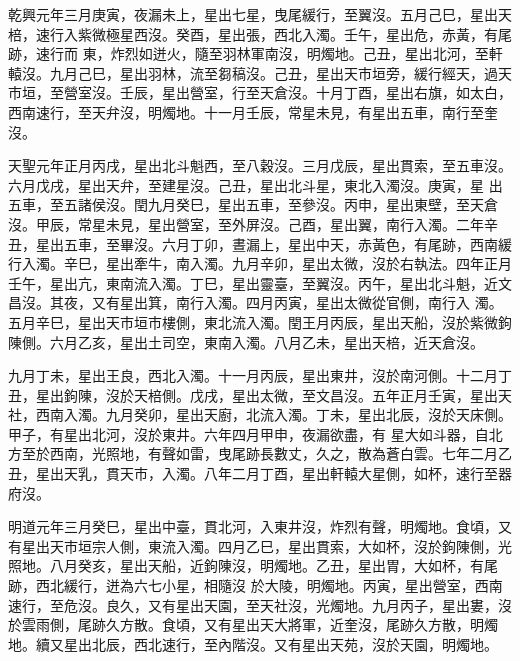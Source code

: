 \begin{pinyinscope}
 乾興元年三月庚寅，夜漏未上，星出七星，曳尾緩行，至翼沒。五月己巳，星出天棓，速行入紫微極星西沒。癸酉，星出張，西北入濁。壬午，星出危，赤黃，有尾跡，速行而
 東，炸烈如迸火，隨至羽林軍南沒，明燭地。己丑，星出北河，至軒轅沒。九月己巳，星出羽林，流至芻稿沒。己丑，星出天市垣旁，緩行經天，過天市垣，至營室沒。壬辰，星出營室，行至天倉沒。十月丁酉，星出右旗，如太白，西南速行，至天弁沒，明燭地。十一月壬辰，常星未見，有星出五車，南行至奎沒。



 天聖元年正月丙戌，星出北斗魁西，至八穀沒。三月戊辰，星出貫索，至五車沒。六月戊戌，星出天弁，至建星沒。己丑，星出北斗星，東北入濁沒。庚寅，星
 出五車，至五諸侯沒。閏九月癸巳，星出五車，至參沒。丙申，星出東壁，至天倉沒。甲辰，常星未見，星出營室，至外屏沒。己酉，星出翼，南行入濁。二年辛丑，星出五車，至畢沒。六月丁卯，晝漏上，星出中天，赤黃色，有尾跡，西南緩行入濁。辛巳，星出牽牛，南入濁。九月辛卯，星出太微，沒於右執法。四年正月壬午，星出亢，東南流入濁。丁巳，星出靈臺，至翼沒。丙午，星出北斗魁，近文昌沒。其夜，又有星出箕，南行入濁。四月丙寅，星出太微從官側，南行入
 濁。五月辛巳，星出天市垣市樓側，東北流入濁。閏王月丙辰，星出天船，沒於紫微鉤陳側。六月乙亥，星出土司空，東南入濁。八月乙未，星出天棓，近天倉沒。



 九月丁未，星出王良，西北入濁。十一月丙辰，星出東井，沒於南河側。十二月丁丑，星出鉤陳，沒於天棓側。戊戌，星出太微，至文昌沒。五年正月壬寅，星出天社，西南入濁。九月癸卯，星出天廚，北流入濁。丁未，星出北辰，沒於天床側。甲子，有星出北河，沒於東井。六年四月甲申，夜漏欲盡，有
 星大如斗器，自北方至於西南，光照地，有聲如雷，曳尾跡長數丈，久之，散為蒼白雲。七年二月乙丑，星出天乳，貫天市，入濁。八年二月丁酉，星出軒轅大星側，如杯，速行至器府沒。



 明道元年三月癸巳，星出中臺，貫北河，入東井沒，炸烈有聲，明燭地。食頃，又有星出天市垣宗人側，東流入濁。四月乙巳，星出貫索，大如杯，沒於鉤陳側，光照地。八月癸亥，星出天船，近鉤陳沒，明燭地。乙丑，星出胃，大如杯，有尾跡，西北緩行，迸為六七小星，相隨沒
 於大陵，明燭地。丙寅，星出營室，西南速行，至危沒。良久，又有星出天園，至天社沒，光燭地。九月丙子，星出婁，沒於雲雨側，尾跡久方散。食頃，又有星出天大將軍，近奎沒，尾跡久方散，明燭地。續又星出北辰，西北速行，至內階沒。又有星出天苑，沒於天園，明燭地。




\end{pinyinscope}
